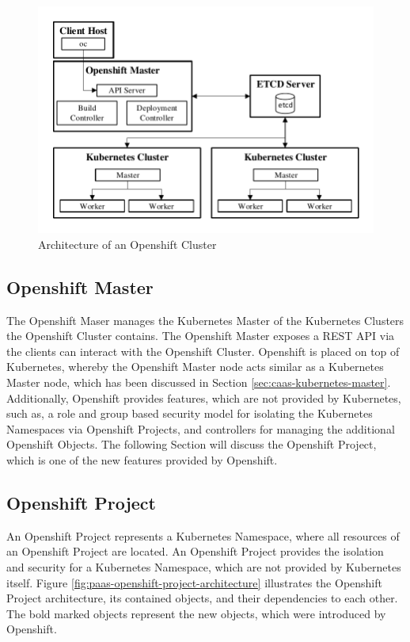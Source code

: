 \begin{figure}
	\centering
	\includegraphics[scale=1]{images/openshift-kubernetes-cluster-architecture.pdf}
	\caption{Architecture of an Openshift Cluster}
	\label{fig:paas-openshift-kubernetes-cluster-architecture}
\end{figure} 

\subsection{Openshift Master}
\label{sec:paas-openshift-master}
The Openshift Maser manages the Kubernetes Master of the Kubernetes Clusters the Openshift Cluster contains. The Openshift Master exposes a REST API via the clients can interact with the Openshift Cluster. Openshift is placed on top of Kubernetes, whereby the Openshift Master node acts similar as a Kubernetes Master node, which has been discussed in Section \vref{sec:caas-kubernetes-master}. Additionally, Openshift provides features, which are not provided by Kubernetes, such as, a role and group based security model for isolating the Kubernetes Namespaces via Openshift Projects, and controllers for managing the additional Openshift Objects. The following Section will discuss the Openshift Project, which is one of the new features provided by Openshift.

\subsection{Openshift Project}
\label{sec:paas-openshift-project}
An Openshift Project represents a Kubernetes Namespace, where all resources of an Openshift Project are located. An Openshift Project provides the isolation and security for a Kubernetes Namespace, which are not provided by Kubernetes itself. Figure \vref{fig:paas-openshift-project-architecture} illustrates the Openshift Project architecture, its contained objects, and their dependencies to each other. The bold marked objects represent the new objects, which were introduced by Openshift.
\newpage

